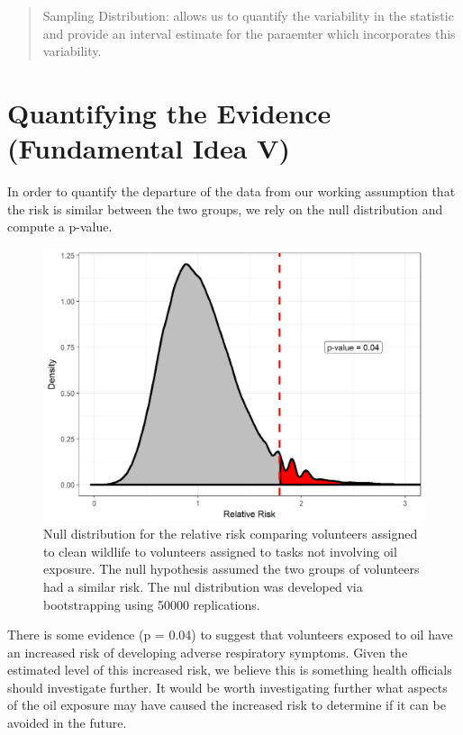 \documentclass[]{book}
\theoremstyle{definition}
\theoremstyle{definition}
\theoremstyle{definition}
\theoremstyle{remark}
\begin{document}
\begin{quote}
Sampling Distribution: allows us to quantify the variability in the
statistic and provide an interval estimate for the paraemter which
incorporates this variability.
\end{quote}

\section{Quantifying the Evidence (Fundamental Idea
V)}\label{quantifying-the-evidence-fundamental-idea-v}

In order to quantify the departure of the data from our working
assumption that the risk is similar between the two groups, we rely on
the null distribution and compute a p-value.

\begin{figure}

{\centering \includegraphics[width=0.8\linewidth]{./Images/recaplanguage-null-distribution-1} 

}

\caption{Null distribution for the relative risk comparing volunteers assigned to clean wildlife to volunteers assigned to tasks not involving oil exposure.  The null hypothesis assumed the two groups of volunteers had a similar risk.  The nul distribution was developed via bootstrapping using 50000 replications.}\label{fig:recaplanguage-null-distribution}
\end{figure}

There is some evidence (p = 0.04) to suggest that volunteers exposed to
oil have an increased risk of developing adverse respiratory symptoms.
Given the estimated level of this increased risk, we believe this is
something health officials should investigate further. It would be worth
investigating further what aspects of the oil exposure may have caused
the increased risk to determine if it can be avoided in the future.
\end{document}
